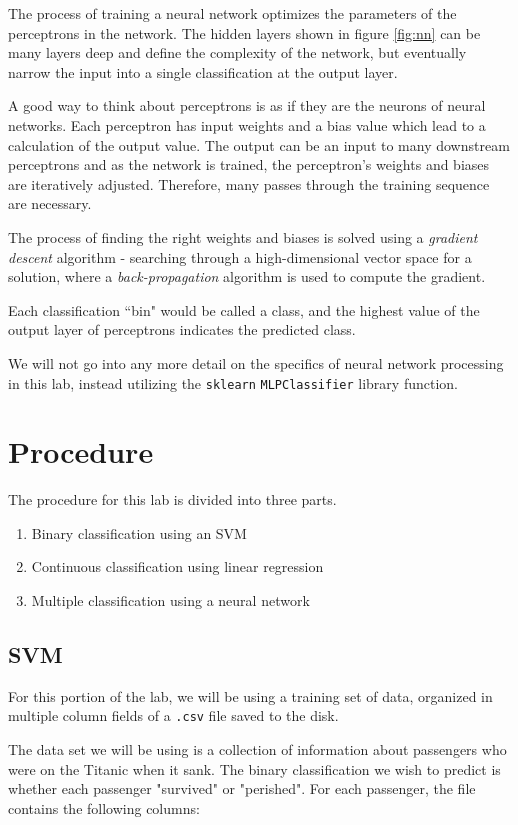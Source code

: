 \documentclass[11pt,a4paper]{article}
\begin{document}
The process of training a neural network optimizes the parameters of the perceptrons in the network. The hidden layers shown in figure \ref{fig:nn} can be many layers deep and define the complexity of the network, but eventually narrow the input into a single classification at the output layer.

A good way to think about perceptrons is as if they are the neurons of neural networks. Each perceptron has input weights and a bias value which lead to a calculation of the output value. The output can be an input to many downstream perceptrons and as the network is trained, the perceptron's weights and biases are iteratively adjusted. Therefore, many passes through the training sequence are necessary.

The process of finding the right weights and biases is solved using a \textit{gradient descent} algorithm - searching through a high-dimensional vector space for a solution, where a \textit{back-propagation} algorithm is used to compute the gradient. 

Each classification ``bin" would be called a class, and the highest value of the output layer of perceptrons indicates the predicted class.

We will not go into any more detail on the specifics of neural network processing in this lab, instead utilizing the \verb|sklearn| \verb|MLPClassifier| library function.

\section{Procedure}
The procedure for this lab is divided into three parts.

\begin{enumerate}
\item Binary classification using an SVM
\item Continuous classification using linear regression
\item Multiple classification using a neural network
\end{enumerate}

\subsection{SVM}
For this portion of the lab, we will be using a training set of data, organized in multiple column fields of a \verb|.csv| file saved to the disk. 

The data set we will be using is a collection of information about passengers who were on the Titanic when it sank. The binary classification we wish to predict is whether each passenger "survived" or "perished". For each passenger, the file contains the following columns:
\end{document}
